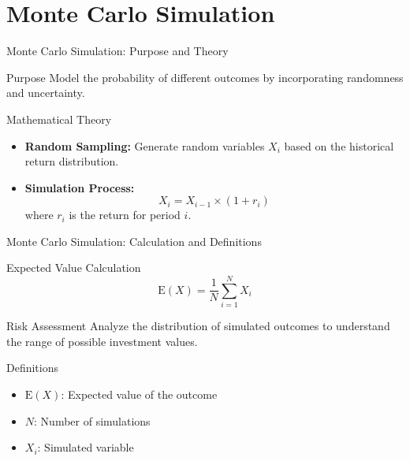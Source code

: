 \documentclass{beamer}
\begin{document}
\section{Monte Carlo Simulation}
\begin{frame}{Monte Carlo Simulation: Purpose and Theory}
    \begin{block}{Purpose}
        Model the probability of different outcomes by incorporating randomness and uncertainty.
    \end{block}
    \begin{block}{Mathematical Theory}
        \begin{itemize}
            \item \textbf{Random Sampling:} Generate random variables \(X_i\) based on the historical return distribution.
            \item \textbf{Simulation Process:}
            \begin{equation*}
                X_i = X_{i-1} \times (1 + r_i)
            \end{equation*}
            where \(r_i\) is the return for period \(i\).
        \end{itemize}
    \end{block}
\end{frame}

\begin{frame}{Monte Carlo Simulation: Calculation and Definitions}
    \begin{block}{Expected Value Calculation}
        \begin{equation*}
            \text{E}(X) = \frac{1}{N} \sum_{i=1}^{N} X_i
        \end{equation*}
    \end{block}
    \begin{block}{Risk Assessment}
        Analyze the distribution of simulated outcomes to understand the range of possible investment values.
    \end{block}
    \begin{block}{Definitions}
        \begin{itemize}
            \item \( \text{E}(X) \): Expected value of the outcome
            \item \( N \): Number of simulations
            \item \( X_i \): Simulated variable
        \end{itemize}
    \end{block}
\end{frame}
\end{document}
